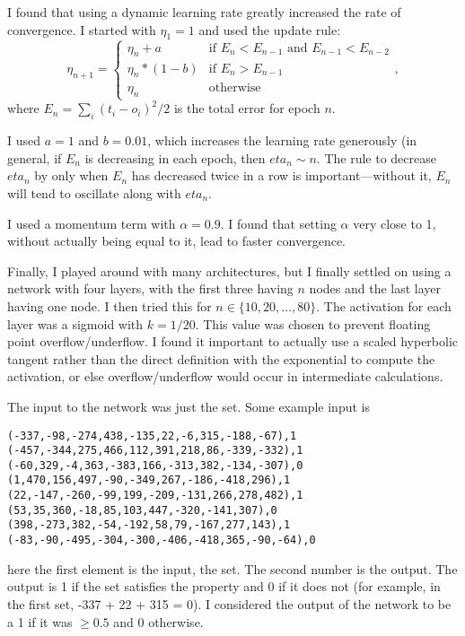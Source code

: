\documentclass[12pt]{article}
\begin{document}
I found that using a dynamic learning rate greatly increased the rate of convergence.  I started with $\eta_1 = 1$ and used the update rule:
\begin{equation}
\eta_{n+1} =
\begin{cases}
   \eta_n + a & \text{if } E_n < E_{n - 1} \text{ and } E_{n - 1} < E_{n - 2} \\
   \eta_n*(1 - b) & \text{if }E_n > E_{n - 1} \\
   \eta_n & \text{otherwise}
\end{cases},
\end{equation}
where $E_n=\sum_i{(t_i - o_i)^2}/2$ is the total error for epoch $n$.

I used $a = 1$ and $b = 0.01$, which increases the learning rate generously (in general, if $E_n$ is decreasing in each epoch, then $eta_n \sim n$.  The rule to decrease $eta_n$ by only when $E_n$ has decreased twice in a row is important---without it, $E_n$ will tend to oscillate along with $eta_n$.

I used a momentum term with $\alpha = 0.9$.  I found that setting $\alpha$ very close to 1, without actually being equal to it, lead to faster convergence.

Finally, I played around with many architectures, but I finally settled on using a network with four layers, with the first three having $n$ nodes and the last layer having one node.  I then tried this for $n\in \{10, 20, \ldots, 80\}$.  The activation for each layer was a sigmoid with $k=1/20$.  This value was chosen to prevent floating point overflow/underflow.  I found it important to actually use a scaled hyperbolic tangent rather than the direct definition with the exponential to compute the activation, or else overflow/underflow would occur in intermediate calculations.

The input to the network was just the set.  Some example input is
\begin{alltt}
    (-337, -98, -274, 438, -135, 22, -6, 315, -188, -67), 1\\
    (-457, -344, 275, 466, 112, 391, 218, 86, -339, -332), 1\\
    (-60, 329, -4, 363, -383, 166, -313, 382, -134, -307), 0\\
    (1, 470, 156, 497, -90, -349, 267, -186, -418, 296), 1\\
    (22, -147, -260, -99, 199, -209, -131, 266, 278, 482), 1\\
    (53, 35, 360, -18, 85, 103, 447, -320, -141, 307), 0\\
    (398, -273, 382, -54, -192, 58, 79, -167, 277, 143), 1\\
    (-83, -90, -495, -304, -300, -406, -418, 365, -90, -64), 0
\end{alltt}
here the first element is the input, the set.  The second number is the output.  The output is 1 if the set satisfies the property and 0 if it does not (for example, in the first set, -337 + 22 + 315 = 0). I considered the output of the network to be a 1 if it was $\geq 0.5$ and 0 otherwise.
\end{document}
